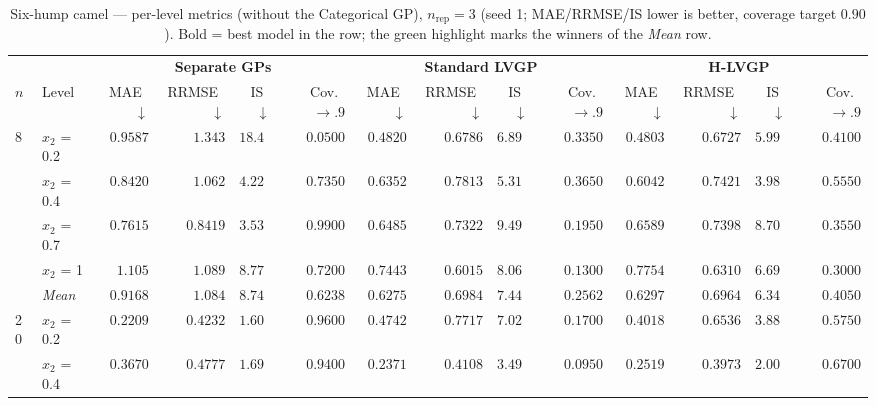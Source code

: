 \begin{table}[htbp]
\centering
\scriptsize
\setlength{\tabcolsep}{2.5pt}
\setlength{\fboxsep}{1pt}
\caption{Six-hump camel --- per-level metrics (without the Categorical GP), $n_{\mathrm{rep}}=3$ (seed 1; MAE/RRMSE/IS lower is better, coverage target $0.90$). Bold = best model in the row; the green highlight marks the winners of the \emph{Mean} row.}
\label{tab:sixhump_camel_nrep03_nocat}
\begin{tabular}{llrrrrrrrrrrrr}
\toprule
 & & \multicolumn{4}{c}{\textbf{Separate GPs}} & \multicolumn{4}{c}{\textbf{Standard LVGP}} & \multicolumn{4}{c}{\textbf{H-LVGP}} \\
\cmidrule(lr){3-6} \cmidrule(lr){7-10} \cmidrule(lr){11-14}
$n$ & Level & MAE~$\downarrow$ & RRMSE~$\downarrow$ & IS~$\downarrow$ & Cov.~$\to.9$ & MAE~$\downarrow$ & RRMSE~$\downarrow$ & IS~$\downarrow$ & Cov.~$\to.9$ & MAE~$\downarrow$ & RRMSE~$\downarrow$ & IS~$\downarrow$ & Cov.~$\to.9$ \\
\midrule
\multirow{5}{*}{8} & $x_2$ = 0.2 & $0.9587$ & $1.343$ & $18.44$ & $0.0500$ & $0.4820$ & $0.6786$ & $6.894$ & $0.3350$ & {\boldmath$0.4803$} & {\boldmath$0.6727$} & {\boldmath$5.995$} & {\boldmath$0.4100$} \\
 & $x_2$ = 0.4 & $0.8420$ & $1.062$ & $4.225$ & {\boldmath$0.7350$} & $0.6352$ & $0.7813$ & $5.313$ & $0.3650$ & {\boldmath$0.6042$} & {\boldmath$0.7421$} & {\boldmath$3.980$} & $0.5550$ \\
 & $x_2$ = 0.7 & $0.7615$ & $0.8419$ & {\boldmath$3.532$} & {\boldmath$0.9900$} & {\boldmath$0.6485$} & {\boldmath$0.7322$} & $9.495$ & $0.1950$ & $0.6589$ & $0.7398$ & $8.700$ & $0.3550$ \\
 & $x_2$ = 1 & $1.105$ & $1.089$ & $8.776$ & {\boldmath$0.7200$} & {\boldmath$0.7443$} & {\boldmath$0.6015$} & $8.065$ & $0.1300$ & $0.7754$ & $0.6310$ & {\boldmath$6.690$} & $0.3000$ \\
 & \textit{Mean} & $0.9168$ & $1.084$ & $8.743$ & \colorbox{green!20}{\boldmath$0.6238$} & \colorbox{green!20}{\boldmath$0.6275$} & $0.6984$ & $7.442$ & $0.2562$ & $0.6297$ & \colorbox{green!20}{\boldmath$0.6964$} & \colorbox{green!20}{\boldmath$6.341$} & $0.4050$ \\
\midrule
\multirow{5}{*}{20} & $x_2$ = 0.2 & {\boldmath$0.2209$} & {\boldmath$0.4232$} & {\boldmath$1.602$} & {\boldmath$0.9600$} & $0.4742$ & $0.7717$ & $7.023$ & $0.1700$ & $0.4018$ & $0.6536$ & $3.886$ & $0.5750$ \\
 & $x_2$ = 0.4 & $0.3670$ & $0.4777$ & {\boldmath$1.698$} & {\boldmath$0.9400$} & {\boldmath$0.2371$} & $0.4108$ & $3.496$ & $0.0950$ & $0.2519$ & {\boldmath$0.3973$} & $2.006$ & $0.6700$ \\

\end{tabular}
\end{table}
